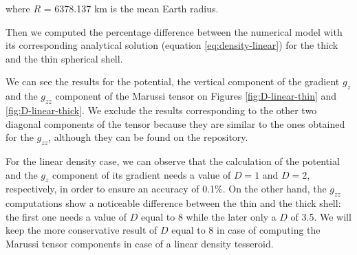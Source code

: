 \documentclass[extra]{gji}
\begin{document}
\noindent where $R$ = 6378.137 km is the mean Earth radius.

Then we computed the percentage difference between the numerical model 
with its corresponding analytical solution (equation 
\ref{eq:density-linear}) for the thick and the thin spherical shell.

We can see the results for the potential, the vertical component of the 
gradient $g_z$ and the $g_{zz}$ component of the Marussi tensor on 
Figures \ref{fig:D-linear-thin} and \ref{fig:D-linear-thick}.
We exclude the results corresponding to the other two diagonal 
components of the tensor because they are similar to the ones obtained 
for the $g_{zz}$, although they can be found on the repository. 

For the linear density case, we can observe that the calculation of the 
potential and the $g_z$ component of its gradient needs a value of 
$D=1$ and $D=2$, respectively, in order to ensure an accuracy of 0.1\%.
On the other hand, the $g_{zz}$ computations show a noticeable 
difference between the thin and the thick shell: the first one needs a 
value of $D$ equal to 8 while the later only a $D$ of 3.5.
We will keep the more conservative result of $D$ equal to 8 in case of 
computing the Marussi tensor components in case of a linear density 
tesseroid.
\end{document}
